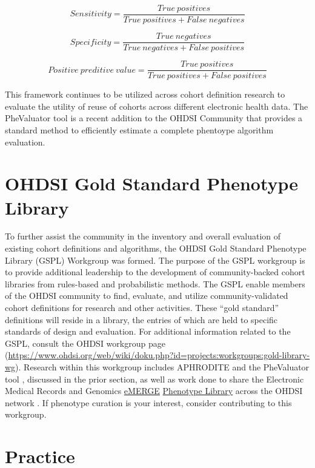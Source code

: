 \documentclass[11pt]{book}
\theoremstyle{definition}
\theoremstyle{definition}
\theoremstyle{definition}
\theoremstyle{remark}
\begin{document}
\[
Sensitivity = \frac{True\ positives}{True\ positives+False\ negatives }
\]

\[
Specificity = \frac{True\ negatives}{True\ negatives+False\ positives }
\]

\[
Positive\ preditive\ value = \frac{True\ positives}{True\ positives+False\ positives }
\]

This framework continues to be utilized across cohort definition research to evaluate the utility of reuse of cohorts across different electronic health data. The PheValuator tool \citep{Swerdel2019phevaluator} is a recent addition to the OHDSI Community that provides a standard method to efficiently estimate a complete phentoype algorithm evaluation.

\hypertarget{ohdsi-gold-standard-phenotype-library}{%
\section{OHDSI Gold Standard Phenotype Library}\label{ohdsi-gold-standard-phenotype-library}}

To further assist the community in the inventory and overall evaluation of existing cohort definitions and algorithms, the OHDSI Gold Standard Phenotype Library (GSPL) Workgroup was formed. The purpose of the GSPL workgroup is to provide additional leadership to the development of community-backed cohort libraries from rules-based and probabilistic methods. The GSPL enable members of the OHDSI community to find, evaluate, and utilize community-validated cohort definitions for research and other activities. These ``gold standard'' definitions will reside in a library, the entries of which are held to specific standards of design and evaluation. For additional information related to the GSPL, consult the OHDSI workgroup page (\url{https://www.ohdsi.org/web/wiki/doku.php?id=projects:workgroups:gold-library-wg}). Research within this workgroup includes APHRODITE \citep{Banda2017APHRODITE} and the PheValuator tool \citep{Swerdel2019phevaluator} , discussed in the prior section, as well as work done to share the Electronic Medical Records and Genomics \href{https://emerge.mc.vanderbilt.edu/}{eMERGE} \href{https://phekb.org/phenotypes}{Phenotype Library} across the OHDSI network \citep{Hripcsak2019eMERGE}. If phenotype curation is your interest, consider contributing to this workgroup.

\hypertarget{practice}{%
\section{Practice}\label{practice}}
\end{document}
